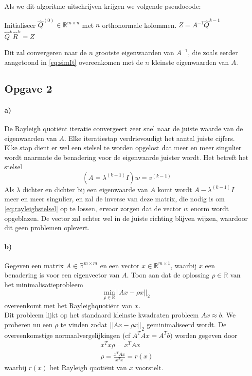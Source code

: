 \documentclass[a4paper, 12pt, titlepage]{report}
\begin{document}
Als we dit algoritme uitschrijven krijgen we volgende pseudocode:\\
\begin{algorithmic}
 \STATE Initialiseer $\hat{Q}^{(0)} \in \mathbb{R}^{m \times n}$ met $n$ orthonormale kolommen.
\STATE $Z = A^{-1}\hat{Q}^{k-1}$
\STATE $\hat{Q}^{k}\hat{R}^{k} = Z$
\ENDFOR
\end{algorithmic}
Dit zal convergeren naar de $n$ grootste eigenwaarden van $A^{-1}$, die zoals eerder aangetoond in \eqref{eq:simIt} overeenkomen met de $n$ kleinste eigenwaarden van $A$.

\subsection{Opgave 2}
\paragraph{a)} 
De Rayleigh quoti\"ent iteratie convergeert zeer snel naar de juiste waarde van de eigenwaarden van $A$. Elke iteratiestap verdrievoudigt het aantal juiste cijfers. Elke stap dient er wel een stelsel te worden opgelost dat meer en meer singulier wordt naarmate de benadering voor de eigenwaarde juister wordt. Het betreft het stelsel
\begin{equation}\label{eq:rayleighstelsel}
 (A=\lambda^{(k-1)}I)w = v^{(k-1)}
\end{equation}
Als $\lambda$ dichter en dichter bij een eigenwaarde van $A$ komt wordt $A-\lambda^{(k-1)}I$ meer en meer singulier, en zal de inverse van deze matrix, die nodig is om \eqref{eq:rayleighstelsel} op te lossen, ervoor zorgen dat de vector $w$ enorm wordt opgeblazen. De vector zal echter wel in de juiste richting blijven wijzen, waardoor dit geen problemen oplevert.\\
\paragraph{b)}
Gegeven een matrix $A \in \mathbb{R}^{m \times m}$ en een vector $x \in \mathbb{R}^{m \times 1}$, waarbij $x$ een benadering is voor een eigenvector van $A$. Toon aan dat de oplossing $\rho \in \mathbb{R}$ van het minimalisatieprobleem 
\begin{equation}
 \underset{\rho \in \mathbb{R}}{\text{min}}|| Ax-\rho x||_{2}
\end{equation}
overeenkomt met het Rayleighquoti\"ent van $x$.\\
Dit probleem lijkt op het standaard kleinste kwadraten probleem $Ax \approx b$. We proberen nu een $\rho$ te vinden zodat $||Ax-\rho x||_{2}$ geminimaliseerd wordt. De overeenkomstige normaalvergelijkingen (cf $A^TAx = A^Tb)$ worden gegeven door 
\begin{subequations}
\begin{align}
  x^Tx\rho = x^TAx\\
 \rho = \frac{x^TAx}{x^Tx}=r(x)
\end{align}
\end{subequations}
waarbij $r(x)$ het Rayleigh quoti\"ent van $x$ voorstelt.
\end{document}
